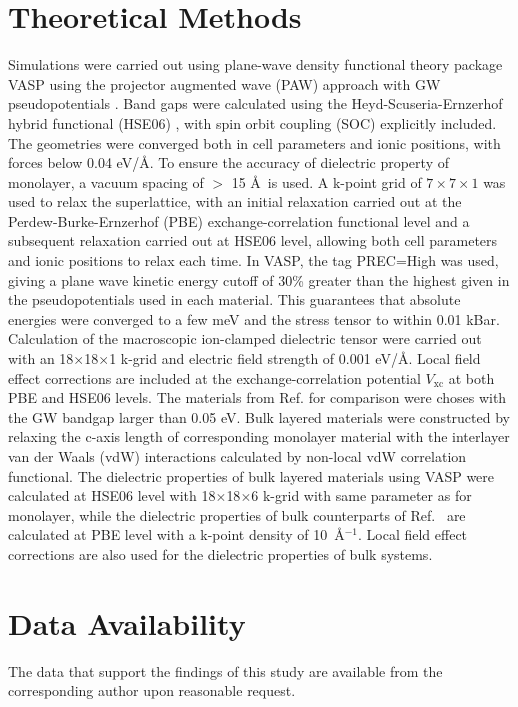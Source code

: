 \section{Theoretical Methods}
\label{sec:org8457dbb}

Simulations were carried out using plane-wave density functional
theory package VASP \cite{Kresse_1993,Kresse_1996_1,Kresse_1996_2}
using the projector augmented wave (PAW) approach with GW
pseudopotentials \cite{Kresse_1999_pseudopotentials}. Band gaps were
calculated using the Heyd-Scuseria-Ernzerhof hybrid functional (HSE06)
\cite{Heyd_2003,HSE_2006}, with spin orbit coupling (SOC) explicitly
included. The geometries were converged both in cell parameters and
ionic positions, with forces below 0.04 eV/\AA. To ensure the accuracy
of dielectric property of monolayer, a vacuum spacing of $>$ 15 \AA~is
used. A k-point grid of \(7\times7\times1\) was used to relax the
superlattice, with an initial relaxation carried out at the
Perdew-Burke-Ernzerhof
(PBE)\cite{Perdew_1996,Ernzerhof_1999,Paier_2005_PBE}
exchange-correlation functional level and a subsequent relaxation
carried out at HSE06 level, allowing both cell parameters and ionic
positions to relax each time. In VASP, the tag PREC=High was used,
giving a plane wave kinetic energy cutoff of 30\% greater than the
highest given in the pseudopotentials used in each material. This
guarantees that absolute energies were converged to a few meV and the
stress tensor to within 0.01 kBar.  Calculation of the macroscopic
ion-clamped dielectric tensor were carried out with an
18$\times$18$\times$1 k-grid and electric field strength of 0.001
eV/\AA.  Local field effect corrections are included at the
exchange-correlation potential $V_{\mathrm{xc}}$ at both PBE and HSE06
levels. The materials from Ref.\cite{Haastrup_2018} for comparison
were choses with the GW bandgap larger than 0.05 eV. Bulk layered
materials were constructed by relaxing the c-axis length of
corresponding monolayer material with the interlayer van der Waals
(vdW) interactions calculated by non-local vdW correlation
functional\cite{Lee_2010_vdFD2}.  The dielectric properties of bulk
layered materials using VASP were calculated at HSE06 level with
18$\times$18$\times$6 k-grid with same parameter as for monolayer,
while the dielectric properties of bulk counterparts of
Ref.~\cite{Haastrup_2018} are calculated at PBE level with a
k-point density of 10~\AA$^{-1}$. Local field effect corrections are
also used for the dielectric properties of bulk systems.


\section{Data Availability}
The data that support the findings of this study are available from
the corresponding author upon reasonable request.



